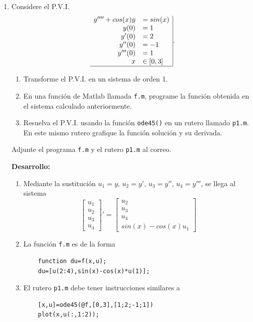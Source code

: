 \documentclass[11pt]{article}
\begin{document}
\begin{enumerate}
\item Considere el P.V.I.
$$
\begin{array}{rl|}
y''''+cos(x)y & =sin(x)\\
y(0)	&=1\\
y'(0)	&=2\\
y''(0)	&=-1\\
y'''(0)	&=1\\
x	&\in [0,3]\\
\hline
\end{array}.
$$
\begin{enumerate}
\item Transforme el P.V.I. en un sistema de orden 1.
\item En una funci\'on de Matlab llamada \texttt{f.m}, programe la funci\'on obtenida en el sistema calculado anteriormente.
\item Resuelva el P.V.I. usando la funci\'on \texttt{ode45()} en un rutero llamado \texttt{p1.m}. En este mismo rutero grafique la funci\'on soluci\'on y su derivada.

\end{enumerate}
Adjunte el programa \texttt{f.m} y el rutero \texttt{p1.m} al correo.

\textbf{Desarrollo:}
\begin{enumerate}
	\item Mediante la sustituci\'on $u_1=y$, $u_2=y'$, $u_3=y''$, $u_4=y'''$, se llega al sistema
    $$
    \begin{bmatrix}
    u_1\\u_2\\u_3\\u_4
    \end{bmatrix}'
    =\begin{bmatrix}
    u_2\\u_3\\u_4\\sin(x)-cos(x)u_1
    \end{bmatrix}
    $$
    \item La funci\'on \texttt{f.m} es de la forma
    \begin{lstlisting}
    function du=f(x,u);
    du=[u(2:4),sin(x)-cos(x)*u(1)];
    \end{lstlisting}
    \item El rutero \texttt{p1.m} debe tener instrucciones similares a
    \begin{lstlisting}
    [x,u]=ode45(@f,[0,3],[1;2;-1;1])
    plot(x,u(:,1:2));
    \end{lstlisting}
\end{enumerate}


\end{enumerate}
\end{document}
